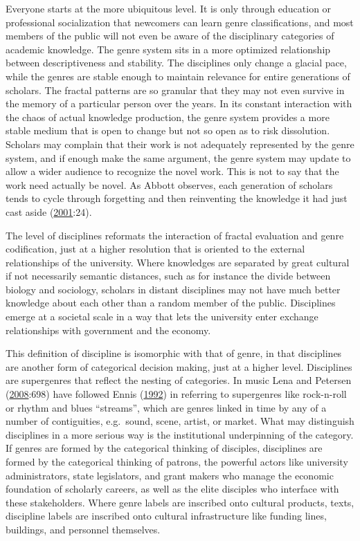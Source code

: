 \documentclass[]{book}
\theoremstyle{definition}
\theoremstyle{definition}
\theoremstyle{definition}
\theoremstyle{remark}
\begin{document}
Everyone starts at the more ubiquitous level. It is only through
education or professional socialization that newcomers can learn genre
classifications, and most members of the public will not even be aware
of the disciplinary categories of academic knowledge. The genre system
sits in a more optimized relationship between descriptiveness and
stability. The disciplines only change a glacial pace, while the genres
are stable enough to maintain relevance for entire generations of
scholars. The fractal patterns are so granular that they may not even
survive in the memory of a particular person over the years. In its
constant interaction with the chaos of actual knowledge production, the
genre system provides a more stable medium that is open to change but
not so open as to risk dissolution. Scholars may complain that their
work is not adequately represented by the genre system, and if enough
make the same argument, the genre system may update to allow a wider
audience to recognize the novel work. This is not to say that the work
need actually be novel. As Abbott observes, each generation of scholars
tends to cycle through forgetting and then reinventing the knowledge it
had just cast aside (\protect\hyperlink{ref-Abbott2001Chaos}{2001}:24).

The level of disciplines reformats the interaction of fractal evaluation
and genre codification, just at a higher resolution that is oriented to
the external relationships of the university. Where knowledges are
separated by great cultural if not necessarily semantic distances, such
as for instance the divide between biology and sociology, scholars in
distant disciplines may not have much better knowledge about each other
than a random member of the public. Disciplines emerge at a societal
scale in a way that lets the university enter exchange relationships
with government and the economy.

This definition of discipline is isomorphic with that of genre, in that
disciplines are another form of categorical decision making, just at a
higher level. Disciplines are supergenres that reflect the nesting of
categories. In music Lena and Petersen
(\protect\hyperlink{ref-Lena2008Classification}{2008}:698) have followed
Ennis (\protect\hyperlink{ref-Ennis1992seventh}{1992}) in referring to
supergenres like rock-n-roll or rhythm and blues ``streams'', which are
genres linked in time by any of a number of contiguities, e.g.~sound,
scene, artist, or market. What may distinguish disciplines in a more
serious way is the institutional underpinning of the category. If genres
are formed by the categorical thinking of disciples, disciplines are
formed by the categorical thinking of patrons, the powerful actors like
university administrators, state legislators, and grant makers who
manage the economic foundation of scholarly careers, as well as the
elite disciples who interface with these stakeholders. Where genre
labels are inscribed onto cultural products, texts, discipline labels
are inscribed onto cultural infrastructure like funding lines,
buildings, and personnel themselves.
\end{document}
